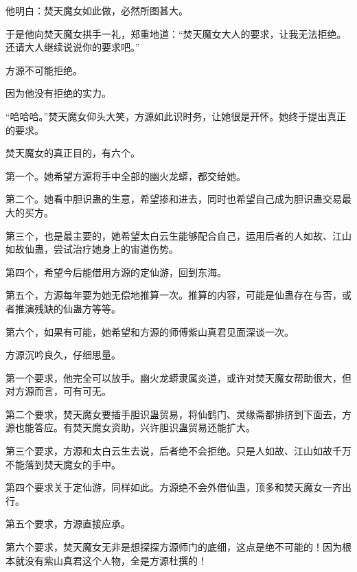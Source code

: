 \begin{this_body}
他明白：焚天魔女如此做，必然所图甚大。

于是他向焚天魔女拱手一礼，郑重地道：“焚天魔女大人的要求，让我无法拒绝。还请大人继续说说你的要求吧。”

方源不可能拒绝。

因为他没有拒绝的实力。

“哈哈哈。”焚天魔女仰头大笑，方源如此识时务，让她很是开怀。她终于提出真正的要求。

焚天魔女的真正目的，有六个。

第一个。她希望方源将手中全部的幽火龙蟒，都交给她。

第二个。她看中胆识蛊的生意，希望掺和进去，同时也希望自己成为胆识蛊交易最大的买方。

第三个，也是最主要的，她希望太白云生能够配合自己，运用后者的人如故、江山如故仙蛊，尝试治疗她身上的宙道伤势。

第四个，希望今后能借用方源的定仙游，回到东海。

第五个，方源每年要为她无偿地推算一次。推算的内容，可能是仙蛊存在与否，或者推演残缺的仙蛊方等等。

第六个，如果有可能，她希望和方源的师傅紫山真君见面深谈一次。

方源沉吟良久，仔细思量。

第一个要求，他完全可以放手。幽火龙蟒隶属炎道，或许对焚天魔女帮助很大，但对方源而言，可有可无。

第二个要求，焚天魔女要插手胆识蛊贸易，将仙鹤门、灵缘斋都排挤到下面去，方源也能答应。有焚天魔女资助，兴许胆识蛊贸易还能扩大。

第三个要求，方源和太白云生去说，后者绝不会拒绝。只是人如故、江山如故千万不能落到焚天魔女的手中。

第四个要求关于定仙游，同样如此。方源绝不会外借仙蛊，顶多和焚天魔女一齐出行。

第五个要求，方源直接应承。

第六个要求，焚天魔女无非是想探探方源师门的底细，这点是绝不可能的！因为根本就没有紫山真君这个人物，全是方源杜撰的！

\end{this_body}

